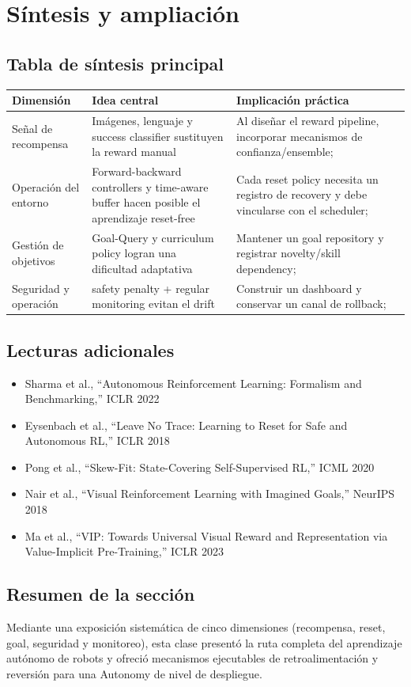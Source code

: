 \section{Síntesis y ampliación}
\subsection{Tabla de síntesis principal}
\begin{tabularx}{\textwidth}{lXl}
\toprule
Dimensión & Idea central & Implicación práctica \\
\midrule
Señal de recompensa & Imágenes, lenguaje y success classifier sustituyen la reward manual & Al diseñar el reward pipeline, incorporar mecanismos de confianza/ensemble; \\
Operación del entorno & Forward-backward controllers y time-aware buffer hacen posible el aprendizaje reset-free & Cada reset policy necesita un registro de recovery y debe vincularse con el scheduler; \\
Gestión de objetivos & Goal-Query y curriculum policy logran una dificultad adaptativa & Mantener un goal repository y registrar novelty/skill dependency; \\
Seguridad y operación & safety penalty + regular monitoring evitan el drift & Construir un dashboard y conservar un canal de rollback; \\
\bottomrule
\end{tabularx}

\subsection{Lecturas adicionales}
\begin{itemize}
\item Sharma et al., ``Autonomous Reinforcement Learning: Formalism and Benchmarking,'' ICLR 2022
\item Eysenbach et al., ``Leave No Trace: Learning to Reset for Safe and Autonomous RL,'' ICLR 2018
\item Pong et al., ``Skew-Fit: State-Covering Self-Supervised RL,'' ICML 2020
\item Nair et al., ``Visual Reinforcement Learning with Imagined Goals,'' NeurIPS 2018
\item Ma et al., ``VIP: Towards Universal Visual Reward and Representation via Value-Implicit Pre-Training,'' ICLR 2023
\end{itemize}

\subsection{Resumen de la sección}
Mediante una exposición sistemática de cinco dimensiones (recompensa, reset, goal, seguridad y monitoreo), esta clase presentó la ruta completa del aprendizaje autónomo de robots y ofreció mecanismos ejecutables de retroalimentación y reversión para una Autonomy de nivel de despliegue.


